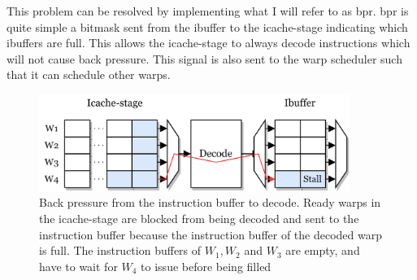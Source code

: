 This problem can be resolved by implementing what I will refer to as \acrfull{bpr}. \acrshort{bpr} is quite simple a bitmask sent from the ibuffer to the icache-stage indicating which ibuffers are full. This allows the icache-stage to always decode instructions which will not cause back pressure. This signal is also sent to the warp scheduler such that it can schedule other warps.

\begin{figure}
    \centering
    \includegraphics[width=0.9\textwidth]{figures/backpressure.png}
    \caption[Illustration of back pressure from the ibuffer to the icache-stage.]{Back pressure from the instruction buffer to decode. Ready warps in the icache-stage are blocked from being decoded and sent to the instruction buffer because the instruction buffer of the decoded warp is full. The instruction buffers of $W_1, W_2$ and $W_3$ are empty, and have to wait for $W_4$ to issue before being filled}
    \label{fig:backpressure}
\end{figure}
